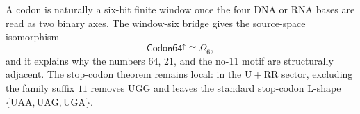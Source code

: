 \begin{corollary}
\label{cor:philosophy-codon-window-allowed-claim}
A codon is naturally a six-bit finite window once the four DNA or RNA
bases are read as two binary axes. The window-six bridge gives the
source-space isomorphism
$$
  \mathsf{Codon64}^{\uparrow}
  \cong
  \Omega_{6},
$$
and it explains why the numbers $64$, $21$, and the no-$11$ motif are
structurally adjacent. The stop-codon theorem remains local: in the
$\mathrm{U}+\mathrm{RR}$ sector, excluding the family suffix $11$
removes $\mathrm{UGG}$ and leaves the standard stop-codon L-shape
$\{\mathrm{UAA},\mathrm{UAG},\mathrm{UGA}\}$.
\end{corollary}
